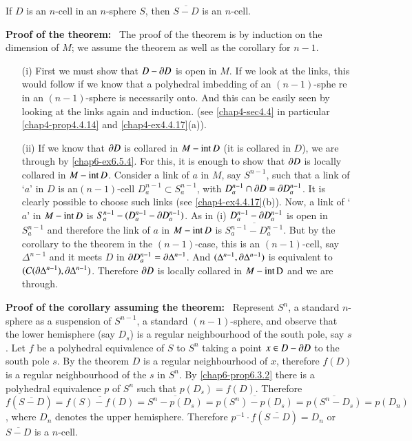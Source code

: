 \begin{corollary}\label{chap6-coro6.5.7}
If $D$ is an $n$-cell in an $n$-sphere $S$, then $\overline{S-D}$ is an $n$-cell.
\end{corollary}

\smallskip
\noindent
{\bf Proof of the theorem:}~ The proof of the theorem is by induction on the dimension of $M$; we assume the theorem as well as the corollary for $n-1$.
\begin{itemize}
\item[(i)] First we must show that $D-\partial D$ is open in $M$. If we look at the links, this would follow if we know that a polyhedral imbedding of an $(n-1)$-sphe
re in an $(n-1)$-sphere is necessarily onto. And this can be easily seen by looking at the links again and induction. (see \ref{chap4-sec4.4} in particular \ref{chap4-prop4.4.14} and \ref{chap4-ex4.4.17}(a)).

\item[(ii)] If we know that $\partial D$ is collared in $M-\text{int\,}D$ (it is collared in $D$), we are through by \ref{chap6-ex6.5.4}. For this, it is enough to show that $\partial D$ is locally collared in $M-\text{int\,}D$. Consider a link of $a$ in $M$, say $S^{n-1}$, such that a link of `$a$' in $D$ is an\pageoriginale $(n-1)$-cell $D^{n-1}_{a}\subset S^{n-1}_{a}$, with $D^{n-1}_{a}\cap \partial D=\partial D^{n-1}_{a}$. It is clearly possible to choose such links (see \ref{chap4-ex4.4.17}(b)). Now, a link of `$a$' in $M-\text{int\,}D$ is $S^{n-1}_{a}-(D^{n-1}_{a}-\partial D^{n-1}_{a})$. As in (i) $D^{n-1}_{a}-\partial D^{n-1}_{a}$ is open in $S^{n-1}_{a}$ and therefore the link of $a$ in $M-\text{int\,}D$ is $\overline{S^{n-1}_{a}-D^{n-1}_{a}}$. But by the 
corollary to the theorem in the $(n-1)$-case, this is an $(n-1)$-cell, say $\Delta^{n-1}$ and it meets $D$ in $\partial D^{n-1}_{a}=\partial \Delta^{n-1}$. And $(\Delta^{n-1},\partial \Delta^{n-1})$ is equivalent to $(C(\partial \Delta^{n-1}),\partial \Delta^{n-1})$. Therefore $\partial D$ is locally collared in $M-\text{int\,D}$ and we are through.
\end{itemize}

\smallskip
\noindent
{\bf Proof of the corollary assuming the theorem:}~ Represent $S^{n}$, a standard $n$-sphere as a suspension of $S^{n-1}$, a standard $(n-1)$-sphere, and observe that the lower hemisphere (say $D_{s}$) is a regular neighbourhood of the south pole, say $s$. Let $f$ be a polyhedral equivalence of $S$ to $S^{n}$ taking a point $x\in D-\partial D$ to the south pole $s$. By the theorem $D$ is a regular neighbourhood of $x$, therefore $f(D)$ is a regular neighbourhood of the $s$ in $S^{n}$. By \ref{chap6-prop6.3.2} there is a polyhedral equivalence $p$ of $S^{n}$ such that $p(D_{s})=f(D)$. Therefore $f(\overline{S-D})=\overline{f(S)-f(D)}=\overline{S^{n}-p(D_{s})}=\overline{p(S^{n})-p(D_{s})}=\overline{p(S^{n}-D_{s})}=p(D_{n})$, where $D_{n}$ denotes the upper hemisphere. Therefore $p^{-1}\cdot f(\overline{S-D})=D_{n}$ or $\overline{S-D}$ is a $n$-cell.


